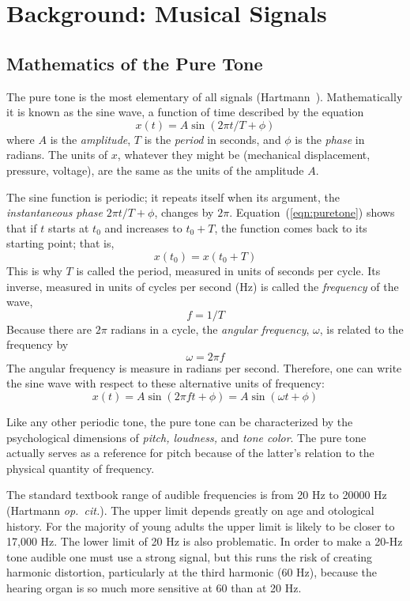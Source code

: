 \section{Background: Musical Signals}
\subsection{Mathematics of the Pure Tone}
The pure tone is the most elementary of all signals
(Hartmann~\cite{Hartmann:1998}).  Mathematically it is known as the
sine wave, a function of time described by the equation 
\begin{equation}
\label{eqn:puretone}
x(t) = A \sin(2 \pi t/T + \phi)
\end{equation}
where $A$ is the \emph{amplitude}, $T$ is the \emph{period} in
seconds, and $\phi$ is the \emph{phase} in radians.  The units of $x$,
whatever they might be (mechanical displacement, pressure, voltage),
are the same as the units of the amplitude $A$.

The sine function is periodic; it repeats itself when its argument,
the \emph{instantaneous phase} $2\pi t/T + \phi$, changes by $2\pi$.
Equation~(\ref{eqn:puretone}) shows that if $t$ starts at $t_0$ and
increases to $t_0 + T$, the function comes back to its starting
point; that is,
\[x(t_0) = x(t_0 + T)\]
This is why $T$ is called the period, measured in units of seconds per
cycle.  Its inverse, measured in units of cycles per second (Hz) is
called the \emph{frequency} of the wave,
\[f = 1/T\]
Because there are $2 \pi$ radians in a cycle, the \emph{angular
frequency}, $\omega$, is related to the frequency by 
\[\omega = 2 \pi f\]
The angular frequency is measure in radians per second.  Therefore, one
can write the sine wave with respect to these alternative units of
frequency: 
\[
x(t) %
= A \sin(2 \pi ft + \phi) = A \sin(\omega t + \phi)
\]

Like any other periodic tone, the pure tone can be characterized by
the psychological dimensions of \emph{pitch, loudness,} and \emph{tone
color}.  The pure tone actually serves as a reference for pitch
because of the latter's relation to the physical quantity of
frequency.

The standard textbook range of audible frequencies is from 20 Hz to
20000 Hz (Hartmann \emph{op.~cit.}).  The upper limit
depends greatly on age and otological history.  For the majority of
young adults the upper limit is likely to be closer to 17,000 Hz.  The
lower limit of 20 Hz is also problematic.  In order to make a 20-Hz
tone audible one must use a strong signal, but this runs the risk of
creating harmonic distortion, particularly at the third harmonic (60
Hz), because the hearing organ is so much more sensitive at 60 than
at 20 Hz.

